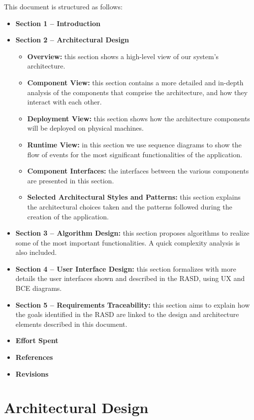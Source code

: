 \documentclass[english]{article}
\begin{document}
This document is structured as follows:
\begin{itemize}
\item{\textbf{Section 1 -- Introduction} }
\item{\textbf{Section 2 -- Architectural Design}
	\begin{itemize}
		\item{\textbf{Overview:} this section shows a high-level view of our system's architecture.}
		\item{\textbf{Component View:} this section contains a more detailed and in-depth analysis of the components that comprise the architecture, and how they interact with each other.}
		\item{\textbf{Deployment View:} this section shows how the architecture components will be deployed on physical machines.}
		\item{\textbf{Runtime View:} in this section we use sequence diagrams to show the flow of events for the most significant functionalities of the application.}
		\item{\textbf{Component Interfaces:} the interfaces between the various components are presented in this section.}
		\item{\textbf{Selected Architectural Styles and Patterns:} this section explains the architectural choices taken and the patterns followed during the creation of the application.}
	\end{itemize}}
\item{\textbf{Section 3 -- Algorithm Design:} this section proposes algorithms to realize some of the most important functionalities. A quick complexity analysis is also included.}
\item{\textbf{Section 4 -- User Interface Design:} this section formalizes with more details the user interfaces shown and described in the RASD, using UX and BCE diagrams.}
\item{\textbf{Section 5 -- Requirements Traceability:} this section aims to explain how the goals identified in the RASD are linked to the design and architecture elements described in this document.}
\item{\textbf{Effort Spent} }
\item{\textbf{References} }
\item{\textbf{Revisions} }
\end{itemize}

\newpage

\section{Architectural Design}
\end{document}
